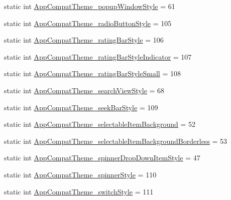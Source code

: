 \begin{DoxyCompactItemize}
\item 
static int \hyperlink{classandroid_1_1support_1_1v7_1_1cardview_1_1R_1_1styleable_a6bbd99358284cc2f4f173afb1fe1bd7c}{App\+Compat\+Theme\+\_\+popup\+Window\+Style} = 61
\item 
static int \hyperlink{classandroid_1_1support_1_1v7_1_1cardview_1_1R_1_1styleable_a7ff022a059deabbb175cc243b5ea6c68}{App\+Compat\+Theme\+\_\+radio\+Button\+Style} = 105
\item 
static int \hyperlink{classandroid_1_1support_1_1v7_1_1cardview_1_1R_1_1styleable_a80912800f5da21eb5d311d314e104c2a}{App\+Compat\+Theme\+\_\+rating\+Bar\+Style} = 106
\item 
static int \hyperlink{classandroid_1_1support_1_1v7_1_1cardview_1_1R_1_1styleable_a3224ccfc3225c5afe3441f7efca1270c}{App\+Compat\+Theme\+\_\+rating\+Bar\+Style\+Indicator} = 107
\item 
static int \hyperlink{classandroid_1_1support_1_1v7_1_1cardview_1_1R_1_1styleable_af7fad53bb6f6481db350fa6bf3d2f4be}{App\+Compat\+Theme\+\_\+rating\+Bar\+Style\+Small} = 108
\item 
static int \hyperlink{classandroid_1_1support_1_1v7_1_1cardview_1_1R_1_1styleable_a71e0ea183bad4ce323aadbefc4dd0910}{App\+Compat\+Theme\+\_\+search\+View\+Style} = 68
\item 
static int \hyperlink{classandroid_1_1support_1_1v7_1_1cardview_1_1R_1_1styleable_a2fa09f08a3cd57107f1bbb78f73175ce}{App\+Compat\+Theme\+\_\+seek\+Bar\+Style} = 109
\item 
static int \hyperlink{classandroid_1_1support_1_1v7_1_1cardview_1_1R_1_1styleable_add903683547560a9e09d1884a4359c03}{App\+Compat\+Theme\+\_\+selectable\+Item\+Background} = 52
\item 
static int \hyperlink{classandroid_1_1support_1_1v7_1_1cardview_1_1R_1_1styleable_a2515e8712f0532b1b2f41d046b23ac29}{App\+Compat\+Theme\+\_\+selectable\+Item\+Background\+Borderless} = 53
\item 
static int \hyperlink{classandroid_1_1support_1_1v7_1_1cardview_1_1R_1_1styleable_a62e180c1f60defc3fbbb0ef9727b592e}{App\+Compat\+Theme\+\_\+spinner\+Drop\+Down\+Item\+Style} = 47
\item 
static int \hyperlink{classandroid_1_1support_1_1v7_1_1cardview_1_1R_1_1styleable_a79aca90da3f26ef28ad85f5c155d9b49}{App\+Compat\+Theme\+\_\+spinner\+Style} = 110
\item 
static int \hyperlink{classandroid_1_1support_1_1v7_1_1cardview_1_1R_1_1styleable_ae03f65b3221dfdd71687a7d31d9a7103}{App\+Compat\+Theme\+\_\+switch\+Style} = 111

\end{DoxyCompactItemize}
